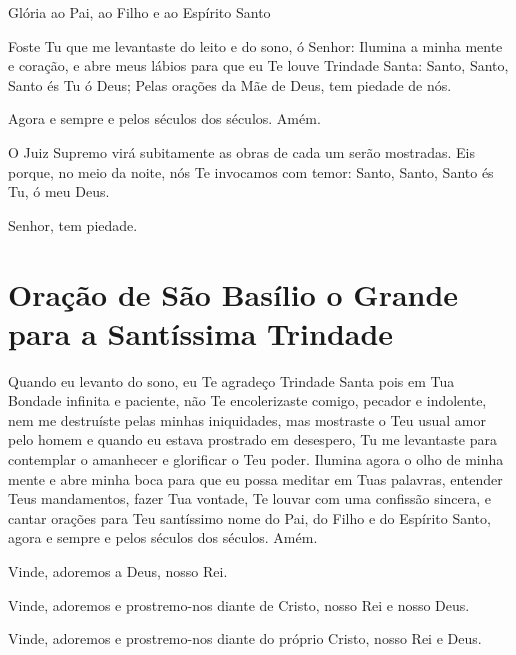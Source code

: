 \documentclass{subfiles}
\begin{document}
Glória ao Pai, ao Filho e ao Espírito Santo

Foste Tu que me levantaste do leito e do sono, ó Senhor: Ilumina a minha mente e
coração, e abre meus lábios para que eu Te louve Trindade Santa: Santo, Santo,
Santo és Tu ó Deus; Pelas orações da Mãe de Deus, tem piedade de nós. 
 
Agora e sempre e pelos séculos dos séculos. Amém.

O Juiz Supremo virá subitamente as obras de cada um serão mostradas. Eis porque,
no meio da noite, nós Te invocamos com temor: Santo, Santo, Santo és Tu, ó meu
Deus. 

Senhor, tem piedade. 


\section{Oração de São Basílio o Grande para a Santíssima Trindade}

Quando eu levanto do sono, eu Te agradeço Trindade Santa pois em 
Tua Bondade infinita e paciente, não Te encolerizaste comigo, pecador e 
indolente, nem me destruíste pelas minhas iniquidades, mas mostraste o Teu 
usual amor pelo homem e quando eu estava prostrado em desespero, Tu me 
levantaste para contemplar o amanhecer e glorificar o Teu poder. Ilumina 
agora o olho de minha mente e abre minha boca para que eu possa meditar 
em Tuas palavras, entender Teus mandamentos, fazer Tua vontade, Te louvar 
com uma confissão sincera, e cantar orações para Teu santíssimo nome do Pai, 
do Filho e do Espírito Santo, agora e sempre e pelos séculos dos séculos. 
Amém. 

Vinde, adoremos a Deus, nosso Rei.

Vinde, adoremos e prostremo-nos diante de Cristo, nosso Rei e nosso Deus.

Vinde, adoremos e prostremo-nos diante do próprio Cristo, nosso Rei e Deus.
\end{document}
